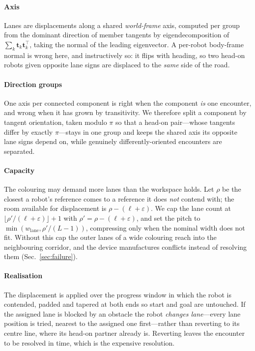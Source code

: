 \documentclass[conference]{IEEEtran}
\begin{document}
\paragraph{Axis} Lanes are displacements along a shared \emph{world-frame} axis, computed
per group from the dominant direction of member tangents by eigendecomposition of
$\sum_k \mathbf{t}_k \mathbf{t}_k^\top$, taking the normal of the leading eigenvector. A
per-robot body-frame normal is wrong here, and instructively so: it flips with heading, so
two head-on robots given opposite lane signs are displaced to the \emph{same} side of the
road.

\paragraph{Direction groups} One axis per connected component is right when the component
\emph{is} one encounter, and wrong when it has grown by transitivity. We therefore split a
component by tangent orientation, taken modulo $\pi$ so that a head-on pair---whose
tangents differ by exactly $\pi$---stays in one group and keeps the shared axis its
opposite lane signs depend on, while genuinely differently-oriented encounters are
separated.

\paragraph{Capacity} The colouring may demand more lanes than the workspace holds. Let
$\rho$ be the closest a robot's reference comes to a reference it does \emph{not} contend
with; the room available for displacement is $\rho - (\ell + \varepsilon)$. We cap the
lane count at $\lfloor \rho'/(\ell{+}\varepsilon)\rfloor + 1$ with
$\rho' = \rho - (\ell + \varepsilon)$, and set the pitch to
$\min(w_{\mathrm{lane}}, \rho'/(L{-}1))$, compressing only when the nominal width does not
fit. Without this cap the outer lanes of a wide colouring reach into the neighbouring
corridor, and the device manufactures conflicts instead of resolving them
(Sec.~\ref{sec:failure}).

\paragraph{Realisation} The displacement is applied over the progress window in which the
robot is contended, padded and tapered at both ends so start and goal are untouched. If the
assigned lane is blocked by an obstacle the robot \emph{changes lane}---every lane position
is tried, nearest to the assigned one first---rather than reverting to its centre line,
where its head-on partner already is. Reverting leaves the encounter to be resolved in
time, which is the expensive resolution.
\end{document}
